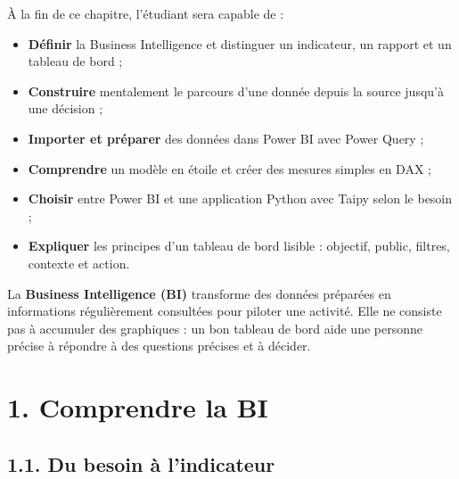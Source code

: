 \documentclass[
  french,
  letterpaper,
  open=any]{scrbook}
\providecommand{\tightlist}{%
  \setlength{\itemsep}{0pt}\setlength{\parskip}{0pt}}
\theoremstyle{definition}
\theoremstyle{definition}
\theoremstyle{remark}
\begin{document}
\begin{tcolorbox}[enhanced jigsaw, arc=.35mm, bottomrule=.15mm, bottomtitle=1mm, breakable, colback=white, colbacktitle=quarto-callout-tip-color!10!white, colframe=quarto-callout-tip-color-frame, coltitle=black, left=2mm, leftrule=.75mm, opacityback=0, opacitybacktitle=0.6, rightrule=.15mm, title=\textcolor{quarto-callout-tip-color}{\faLightbulb}\hspace{0.5em}{Objectifs du chapitre}, titlerule=0mm, toprule=.15mm, toptitle=1mm]

À la fin de ce chapitre, l'étudiant sera capable de :

\begin{itemize}
\tightlist
\item
  \textbf{Définir} la Business Intelligence et distinguer un indicateur,
  un rapport et un tableau de bord ;
\item
  \textbf{Construire} mentalement le parcours d'une donnée depuis la
  source jusqu'à une décision ;
\item
  \textbf{Importer et préparer} des données dans Power BI avec Power
  Query ;
\item
  \textbf{Comprendre} un modèle en étoile et créer des mesures simples
  en DAX ;
\item
  \textbf{Choisir} entre Power BI et une application Python avec Taipy
  selon le besoin ;
\item
  \textbf{Expliquer} les principes d'un tableau de bord lisible :
  objectif, public, filtres, contexte et action.
\end{itemize}

\end{tcolorbox}

La \textbf{Business Intelligence (BI)} transforme des données préparées
en informations régulièrement consultées pour piloter une activité. Elle
ne consiste pas à accumuler des graphiques : un bon tableau de bord aide
une personne précise à répondre à des questions précises et à décider.

\section{1. Comprendre la BI}\label{comprendre-la-bi}

\subsection{1.1. Du besoin à
l'indicateur}\label{du-besoin-uxe0-lindicateur}
\end{document}
